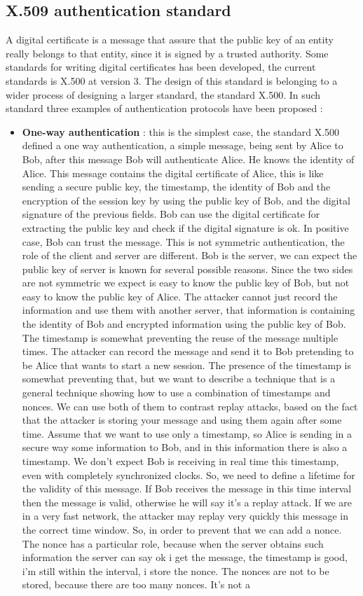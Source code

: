 \documentclass[11pt]{article}
\begin{document}
\subsection{X.509 authentication standard}
A digital certificate is a message that assure that the public key of an entity really belongs to that entity, since it is signed by a trusted authority. Some standards for writing digital certificates has been developed, the current standards is X.500 at version 3. The design of this standard is belonging to a wider process of designing a larger standard, the standard X.500. In such standard three examples of authentication protocols have been proposed :
\begin{itemize}
\item \textbf{One-way authentication} : this is the simplest case, the standard
X.500 defined a one way authentication, a simple message, being sent by Alice to Bob, after this message Bob will authenticate Alice. He knows the identity of Alice. This message contains the digital certificate of Alice, this is like sending a secure public key, the timestamp, the identity of Bob and the encryption of the session key by using the public key of Bob, and the digital signature of the previous fields. Bob can use the digital certificate for extracting the public key and check if the digital signature is ok. In positive case, Bob can trust the message. This is not symmetric authentication, the role of the client and server are different. Bob is the server, we can expect the public key of server is known for several possible reasons. Since the two sides are not symmetric we expect is easy to know the public key of Bob, but not easy to know the public key of Alice. The attacker cannot just record the information and use them with another server, that information is containing the identity of Bob and encrypted information using the public key of Bob. The timestamp is somewhat preventing the reuse of the message multiple times. The attacker can record the message and send it to Bob pretending to be Alice that wants to start a new session. The presence of the timestamp is somewhat preventing that, but we want to describe a technique that is a general technique showing how to use a combination of timestamps and nonces. We can use both of them to contrast replay attacks, based on the fact that the attacker is storing your message and using them again after some time. Assume that we want to use only a timestamp, so Alice is sending in a secure way some information to Bob, and in this information there is also a timestamp. We don't expect Bob is receiving in real time this timestamp, even with completely synchronized clocks. So, we need to define a lifetime for the validity of this message. If Bob receives the message in this time interval then the message is valid, otherwise he will say it's a replay attack. If we are in a very fast network, the attacker may replay very quickly this message in the correct time window. So, in order to prevent that we can add a nonce. The nonce has a particular role, because when the server obtains such information the server can say ok i get the message, the timestamp is good, i'm still within the interval, i store the nonce. The nonces are not to be stored, because there are too many nonces. It's not a 
\end{itemize}
\end{document}
